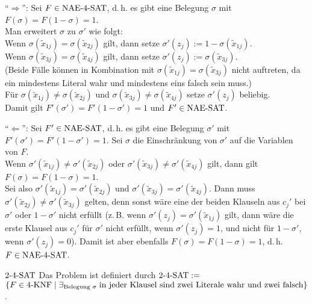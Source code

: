 \begin{Beweis}
    "`$\Rightarrow$"':
    Sei $F \in \text{NAE-}4\text{-SAT}$,
    d.\,h. es gibt eine Belegung $\sigma$ mit $F(\sigma) = F(1 - \sigma) = 1$.\\
    Man erweitert $\sigma$ zu $\sigma'$ wie folgt:\\
    Wenn $\sigma(\widetilde{x}_{1j}) = \sigma(\widetilde{x}_{2j})$ gilt, dann setze
    $\sigma'(z_j) := 1 - \sigma(\widetilde{x}_{1j})$.\\
    Wenn $\sigma(\widetilde{x}_{3j}) = \sigma(\widetilde{x}_{4j})$ gilt, dann setze
    $\sigma'(z_j) := \sigma(\widetilde{x}_{3j})$.\\
    (Beide Fälle können in Kombination mit
    $\sigma(\widetilde{x}_{1j}) = \sigma(\widetilde{x}_{3j})$
    nicht auftreten, da ein mindestens Literal wahr und mindestens eins falsch sein muss.)\\
    Für $\sigma(\widetilde{x}_{1j}) \not= \sigma(\widetilde{x}_{2j})$ und
    $\sigma(\widetilde{x}_{3j}) \not= \sigma(\widetilde{x}_{4j})$ setze
    $\sigma'(z_j)$ beliebig.\\
    Damit gilt $F'(\sigma') = F'(1 - \sigma') = 1$ und $F' \in \text{NAE-SAT}$.

    "`$\Leftarrow$"':
    Sei $F' \in \text{NAE-SAT}$,
    d.\,h. es gibt eine Belegung $\sigma'$ mit $F'(\sigma') = F'(1 - \sigma') = 1$.
    Sei $\sigma$ die Einschränkung von $\sigma'$ auf die Variablen von $F$.\\
    Wenn $\sigma'(\widetilde{x}_{1j}) \not= \sigma'(\widetilde{x}_{2j})$ oder
    $\sigma'(\widetilde{x}_{3j}) \not= \sigma'(\widetilde{x}_{4j})$ gilt,
    dann gilt $F(\sigma) = F(1 - \sigma) = 1$.\\
    Sei also $\sigma'(\widetilde{x}_{1j}) = \sigma'(\widetilde{x}_{2j})$ und
    $\sigma'(\widetilde{x}_{3j}) = \sigma'(\widetilde{x}_{4j})$.
    Dann muss $\sigma'(\widetilde{x}_{2j}) \not= \sigma'(\widetilde{x}_{3j})$ gelten,
    denn sonst wäre eine der beiden Klauseln aus $c_j'$ bei $\sigma'$ oder $1 - \sigma'$
    nicht erfüllt
    (z.\,B. wenn $\sigma'(z_j) = \sigma'(\widetilde{x}_{1j})$ gilt,
    dann wäre die erste Klausel aus $c_j'$ für $\sigma'$ nicht erfüllt, wenn
    $\sigma'(z_j) = 1$, und nicht für $1 - \sigma'$, wenn $\sigma'(z_j) = 0$).
    Damit ist aber ebenfalls $F(\sigma) = F(1 - \sigma) = 1$, d.\,h. $F \in \text{NAE-}4\text{-SAT}$.
\end{Beweis}

\linie

\begin{Def}{$2\text{-}4\text{-SAT}$}
    Das Problem  ist definiert durch $2\text{-}4\text{-SAT} :=$\\
    $\{F \in 4\text{-KNF} \;|\; \exists_{\text{Belegung } \sigma}\;
    \text{in jeder Klausel sind zwei Literale wahr und zwei falsch}\}$.
\end{Def}


